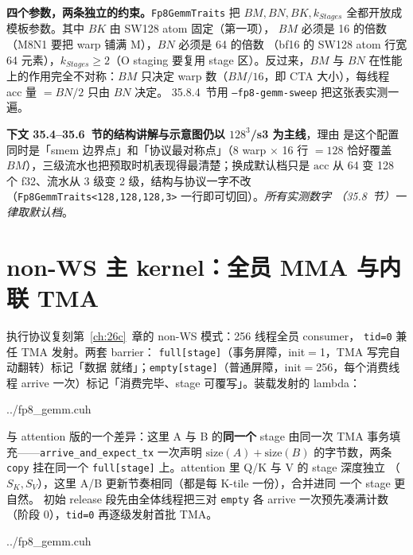 \textbf{四个参数，两条独立的约束。}\texttt{Fp8GemmTraits} 把 $BM,BN,BK,
k_{Stages}$ 全都开放成模板参数。其中 $BK$ 由 SW128 atom 固定（第一项），
$BM$ 必须是 16 的倍数（M8N1 要把 warp 铺满 M），$BN$ 必须是 64 的倍数
（bf16 的 SW128 atom 行宽 64 元素），$k_{Stages}\ge 2$（O staging 要复用
stage 区）。反过来，$BM$ 与 $BN$ 在性能上的作用完全不对称：$BM$ 只决定
warp 数（$BM/16$，即 CTA 大小），每线程 acc 量 $=BN/2$ 只由 $BN$ 决定。
35.8.4~节用 \texttt{--fp8-gemm-sweep} 把这张表实测一遍。

\textbf{下文 35.4--35.6~节的结构讲解与示意图仍以 $128^3$/s3 为主线}，理由
是这个配置同时是「smem 边界点」和「协议最对称点」（8 warp $\times$ 16 行
$=128$ 恰好覆盖 $BM$），三级流水也把预取时机表现得最清楚；换成默认档只是
$\mathrm{acc}$ 从 64 变 128 个 f32、流水从 3 级变 2 级，结构与协议一字不改
（\texttt{Fp8GemmTraits<128,128,128,3>} 一行即可切回）。\emph{所有实测数字
（35.8~节）一律取默认档}。

\section{non-WS 主 kernel：全员 MMA 与内联 TMA}\label{sec:35-nonws}

执行协议复刻第~\ref{ch:26c}~章的 non-WS 模式：256 线程全员 consumer，
\texttt{tid=0} 兼任 TMA 发射。两套 barrier：
\texttt{full[stage]}（事务屏障，init$=$1，TMA 写完自动翻转）标记「数据
就绪」；\texttt{empty[stage]}（普通屏障，init$=$256，每个消费线程 arrive
一次）标记「消费完毕、stage 可覆写」。装载发射的 lambda：

\begin{lstinputlisting}[linerange={486-512},firstnumber=auto,
  title={fp8\_gemm.cuh L486-512（issue\_tma：单 barrier 覆盖 A+B 双字段 + 初始 release）}]{../fp8_gemm.cuh}
\end{lstinputlisting}

与 attention 版的一个差异：这里 A 与 B 的\textbf{同一个} stage 由同一次
TMA 事务填充——\texttt{arrive\_and\_expect\_tx} 一次声明
$\mathrm{size}(A)+\mathrm{size}(B)$ 的字节数，两条 \texttt{copy} 挂在同一个
\texttt{full[stage]} 上。attention 里 Q/K 与 V 的 stage 深度独立
（$S_K,S_V$），这里 A/B 更新节奏相同（都是每 K-tile 一份），合并进同
一个 stage 更自然。
初始 release 段先由全体线程把三对 \texttt{empty} 各 arrive 一次预先凑满计数
（阶段 0），\texttt{tid=0} 再逐级发射首批 TMA。

\begin{lstinputlisting}[linerange={514-543},firstnumber=auto,
  title={fp8\_gemm.cuh L514-543（主循环：wait full $\to$ gemm\_ss $\to$ arrive empty $\to$ 预取）}]{../fp8_gemm.cuh}
\end{lstinputlisting}

